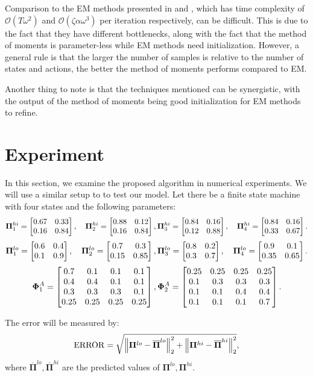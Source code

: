 Comparison to the EM methods presented in \cite{zhiyu20} and \cite{Giammarino_2021}, which has time complexity of $\mathcal{O}(T\omega^2)$ and $\mathcal{O}(\zeta\alpha\omega^3)$ per iteration respectively, can be difficult. This is due to the fact that they have different bottlenecks, along with the fact that the method of moments is parameter-less while EM methods need initialization. However, a general rule is that the larger the number of samples is relative to the number of states and actions, the better the method of moments performs compared to EM.

Another thing to note is that the techniques mentioned can be synergistic, with the output of the method of moments being good initialization for EM methods to refine.
\section{Experiment}
In this section, we examine the proposed algorithm in numerical experiments.
We will use a similar setup to \cite{zhiyu20} to test our model. Let there be a finite state machine with four states and the following parameters:
\[
    \bm{\Pi}^{hi}_1=\bmat{0.67&0.33\\0.16&0.84},\quad
    \bm{\Pi}^{hi}_2=\bmat{0.88&0.12\\0.16&0.84},\\
    \bm{\Pi}^{hi}_3=\bmat{0.84&0.16\\0.12&0.88},\quad
    \bm{\Pi}^{hi}_4=\bmat{0.84&0.16\\0.33&0.67}.%
\]
\[
    \bm{\Pi}^{lo}_1=\bmat{0.6&0.4\\0.1&0.9},\quad
    \bm{\Pi}^{lo}_2=\bmat{0.7&0.3\\0.15&0.85},\\
    \bm{\Pi}^{lo}_3=\bmat{0.8&0.2\\0.3&0.7},\quad
    \bm{\Pi}^{lo}_4=\bmat{0.9&0.1\\0.35&0.65}.%
\]
\[
    \bm{\Phi}^A_1=\bmat{0.7&0.1&0.1&0.1\\
        0.4&0.4&0.1&0.1\\0.3&0.3&0.3&0.1\\
        0.25&0.25&0.25&0.25},\\
    \bm{\Phi}^A_2=\bmat{0.25&0.25&0.25&0.25\\
        0.1&0.3&0.3&0.3\\0.1&0.1&0.4&0.4\\
        0.1&0.1&0.1&0.7}.%
\]

The error will be measured by:
\[
    \mathrm{ERROR}=\sqrt{\left\|{\bm{\Pi}^{lo}-\overline{\bm{\Pi}}^{lo}}\right\|^2_2
        +\left\|{\bm{\Pi}^{hi}-\overline{\bm{\Pi}}^{hi}}\right\|^2_2},
\]
where $\overline{\bm{\Pi}}^{lo},\overline{\bm{\Pi}}^{hi}$ are the predicted values of $\bm{\Pi}^{lo},\bm{\Pi}^{hi}$.

